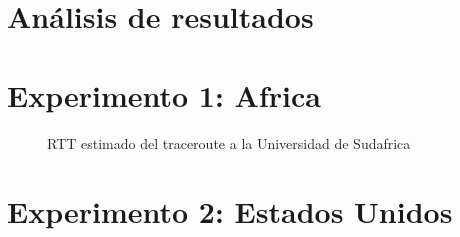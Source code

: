 	
\section{Análisis de resultados}

\section{Experimento 1: Africa}
\begin{figure}[H]
  \centering
  \caption{RTT estimado del traceroute a la Universidad de Sudafrica}
  \label{africaTTL}
\end{figure}

\section{Experimento 2: Estados Unidos}


